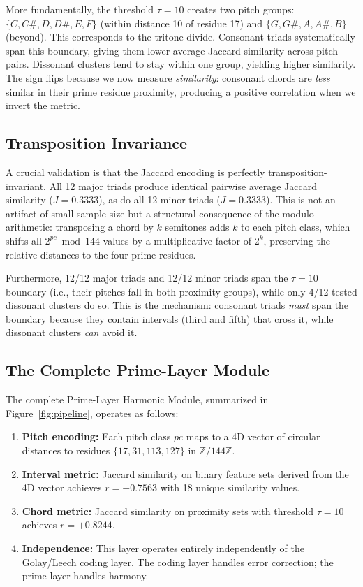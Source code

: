 \documentclass[11pt,a4paper]{article}
\theoremstyle{definition}
\begin{document}
More fundamentally, the threshold $\tau = 10$ creates two pitch groups: $\{C, C\#, D, D\#, E, F\}$ (within distance 10 of residue 17) and $\{G, G\#, A, A\#, B\}$ (beyond). This corresponds to the tritone divide. Consonant triads systematically span this boundary, giving them lower average Jaccard similarity across pitch pairs. Dissonant clusters tend to stay within one group, yielding higher similarity. The sign flips because we now measure \emph{similarity}: consonant chords are \emph{less} similar in their prime residue proximity, producing a positive correlation when we invert the metric.

\subsection{Transposition Invariance}

A crucial validation is that the Jaccard encoding is perfectly transposition-invariant. All 12 major triads produce identical pairwise average Jaccard similarity ($J = 0.3333$), as do all 12 minor triads ($J = 0.3333$). This is not an artifact of small sample size but a structural consequence of the modulo arithmetic: transposing a chord by $k$ semitones adds $k$ to each pitch class, which shifts all $2^{pc} \bmod 144$ values by a multiplicative factor of $2^k$, preserving the relative distances to the four prime residues.

Furthermore, 12/12 major triads and 12/12 minor triads span the $\tau = 10$ boundary (i.e., their pitches fall in both proximity groups), while only 4/12 tested dissonant clusters do so. This is the mechanism: consonant triads \emph{must} span the boundary because they contain intervals (third and fifth) that cross it, while dissonant clusters \emph{can} avoid it.

\subsection{The Complete Prime-Layer Module}

The complete Prime-Layer Harmonic Module, summarized in Figure~\ref{fig:pipeline}, operates as follows:

\begin{enumerate}[leftmargin=2em]
\item \textbf{Pitch encoding:} Each pitch class $pc$ maps to a 4D vector of circular distances to residues $\{17, 31, 113, 127\}$ in $\mathbb{Z}/144\mathbb{Z}$.
\item \textbf{Interval metric:} Jaccard similarity on binary feature sets derived from the 4D vector achieves $r = +0.7563$ with 18 unique similarity values.
\item \textbf{Chord metric:} Jaccard similarity on proximity sets with threshold $\tau = 10$ achieves $r = +0.8244$.
\item \textbf{Independence:} This layer operates entirely independently of the Golay/Leech coding layer. The coding layer handles error correction; the prime layer handles harmony.
\end{enumerate}
\end{document}
